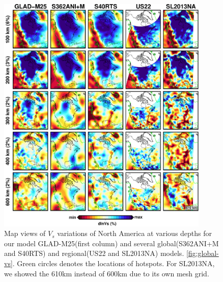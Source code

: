 \documentclass[extra,mreferee]{gji}
\begin{document}
\begin{figure}
\centering
\includegraphics[width=0.9\textwidth]{figures/depth_slice/america_vs.pdf}
\caption{Map views of $V_s$ variations of North America at various depths for our model GLAD-M25(first column) and several global(S362ANI+M and S40RTS) and regional(US22 and SL2013NA) models. \ref{fig:global-vs}. Green circles denotes the locations of hotspots. For SL2013NA, we showed the 610km instead of 600km due to its own mesh grid.}
\label{fig:global-vp}

\end{figure}
\end{document}
